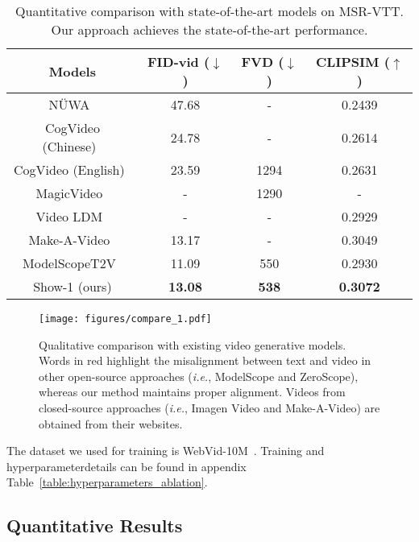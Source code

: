 \documentclass{article} \usepackage{iclr2024_conference,times}
\newcommand{\ie}{\textit{i.e.}}
\begin{document}
 \begin{table}[t]
\centering


\caption{
Quantitative comparison with state-of-the-art models on MSR-VTT. Our approach achieves the state-of-the-art performance.}
\begin{tabular}{c|ccc}
\hline
\textbf{Models}              & FID-vid ($\downarrow$)   &  FVD ($\downarrow$) & CLIPSIM ($\uparrow$) \\ \hline
N\"UWA~\citep{wu2022nuwa}       & 47.68   & -  & 0.2439        \\
CogVideo (Chinese)~\citep{hong2022cogvideo}   & 24.78 & - & 0.2614      \\
CogVideo (English)~\citep{hong2022cogvideo}   & 23.59  & 1294 & 0.2631  \\
MagicVideo~\citep{zhou2022magicvideo}          & -    & 1290 & -        \\
Video LDM~\citep{blattmann2023align}      & -   &  - & 0.2929 \\ 
Make-A-Video~\citep{singer2022make}        & 13.17 &  -& 0.3049     \\ 
ModelScopeT2V~\citep{wang2023modelscope}  &   11.09 & 550 & 0.2930    \\ 
\hline

Show-1 (ours) &  \textbf{13.08} & \textbf{538} & \textbf{0.3072}   \\ \hline
\end{tabular}



\label{mrtt}
\end{table} 

\begin{figure}[t!]
    \centering
    \texttt{[image: figures/compare\_1.pdf]}
    \caption{Qualitative comparison with existing video generative models. Words in red highlight the misalignment between text and video in other open-source approaches (\ie, ModelScope and ZeroScope), whereas our method maintains proper alignment. Videos from closed-source approaches (\ie, Imagen Video and Make-A-Video) are obtained from their websites.}
    \label{fig:compare_1}
\end{figure}

The dataset we used for training is WebVid-10M~\citep{bain2021frozen}. 
Training and hyperparameterdetails can be found in appendix Table~\ref{table:hyperparameters_ablation}.




\subsection{Quantitative Results}
\end{document}
